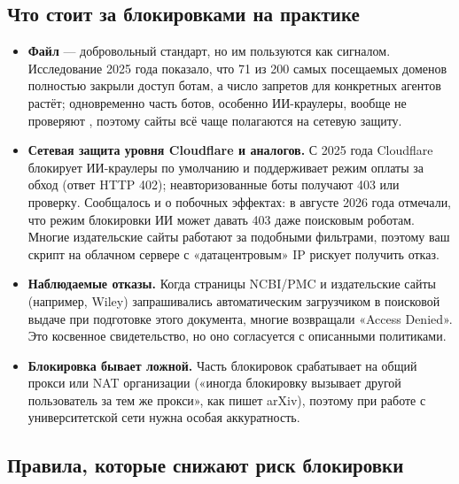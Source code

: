\documentclass[11pt,a4paper]{article}
\newcommand{\code}[1]{\texttt{\detokenize{#1}}}
\begin{document}
\subsection{Что стоит за блокировками на практике}

\begin{itemize}
  \item \textbf{Файл \code{robots.txt}} --- добровольный стандарт, но им пользуются как сигналом. Исследование 2025 года показало, что 71 из 200 самых посещаемых доменов полностью закрыли доступ ботам, а число запретов для конкретных агентов растёт; одновременно часть ботов, особенно ИИ-краулеры, вообще не проверяют \code{robots.txt}, поэтому сайты всё чаще полагаются на сетевую защиту.
  \item \textbf{Сетевая защита уровня Cloudflare и аналогов.} С 2025 года Cloudflare блокирует ИИ-краулеры по умолчанию и поддерживает режим оплаты за обход (ответ HTTP 402); неавторизованные боты получают 403 или проверку. Сообщалось и о побочных эффектах: в августе 2026 года отмечали, что режим блокировки ИИ может давать 403 даже поисковым роботам. Многие издательские сайты работают за подобными фильтрами, поэтому ваш скрипт на облачном сервере с «датацентровым» IP рискует получить отказ.
  \item \textbf{Наблюдаемые отказы.} Когда страницы NCBI/PMC и издательские сайты (например, Wiley) запрашивались автоматическим загрузчиком в поисковой выдаче при подготовке этого документа, многие возвращали «Access Denied». Это косвенное свидетельство, но оно согласуется с описанными политиками.
  \item \textbf{Блокировка бывает ложной.} Часть блокировок срабатывает на общий прокси или NAT организации («иногда блокировку вызывает другой пользователь за тем же прокси», как пишет arXiv), поэтому при работе с университетской сети нужна особая аккуратность.
\end{itemize}

\subsection{Правила, которые снижают риск блокировки}
\end{document}
